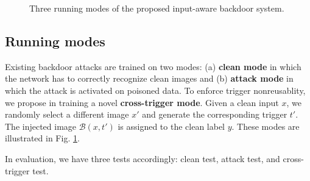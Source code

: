 \begin{figure}[t]
\centering
{}
\hspace{2mm}
\hspace{2mm}

\caption{Three running modes of the proposed input-aware backdoor system.}
\label{fig:modes}
\end{figure}
 
\subsection{Running modes}
Existing backdoor attacks are trained on two modes: (a) \textbf{clean mode} in which the network has to correctly recognize clean images and (b) \textbf{attack mode} in which the attack is activated on poisoned data. To enforce trigger nonreusablity, we propose in training a novel \textbf{cross-trigger mode}. Given a clean input $x$, we randomly select a different image $x'$ and generate the corresponding trigger $t'$. The injected image $\mathcal{B}(x,t')$ is assigned to the clean label $y$. These modes are illustrated in Fig. \ref{fig:modes}.

In evaluation, we have three tests accordingly: clean test, attack test, and cross-trigger test.

